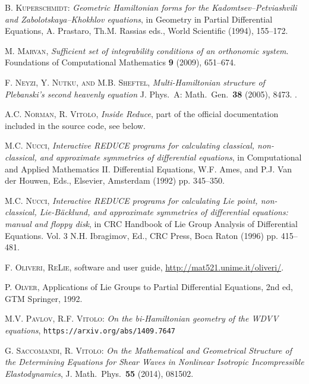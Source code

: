 \begin{thebibliography}{999}
 \textsc{B. Kuperschmidt}:
  \emph{Geometric Hamiltonian forms for the
    Kadomtsev--Petviashvili and Zabolotskaya--Khokhlov equations}, in Geometry
  in Partial Differential Equations, A. Prastaro, Th.M. Rassias eds., World
  Scientific (1994), 155--172.

 \textsc{M. Marvan}, \emph{Sufficient set of integrability
    conditions of an orthonomic system}.  Foundations of Computational
    Mathematics \textbf{9} (2009), 651--674.

 \textsc{F. Neyzi, Y. Nutku, and
      M.B. Sheftel}, \emph{Multi-Hamiltonian structure of Plebanski's second
      heavenly equation} J. Phys.\ A: Math.\ Gen.\ \textbf{38} (2005),
    8473. .

 \textsc{A.C. Norman, R. Vitolo}, \emph{Inside Reduce}, part
    of the official \REDUCE documentation included in the source code, see
    below.

 \textsc{M.C. Nucci}, \emph{Interactive REDUCE
      programs for calculating classical, non-classical, and approximate
      symmetries of differential equations}, in Computational and Applied
    Mathematics II. Differential Equations, W.F. Ames, and P.J. Van der Houwen,
    Eds., Elsevier, Amsterdam (1992) pp. 345--350.

 \textsc{M.C. Nucci}, \emph{Interactive REDUCE programs for
    calculating Lie point, non-classical, Lie-B\"{a}cklund, and approximate
    symmetries of differential equations: manual and floppy disk}, in
CRC Handbook of Lie Group Analysis of Differential Equations. Vol. 3
N.H. Ibragimov, Ed., CRC Press, Boca Raton (1996) pp. 415--481.

 \textsc{F. Oliveri}, \textsc{ReLie}, \REDUCE software and user
  guide, \url{http://mat521.unime.it/oliveri/}.

 \textsc{P. Olver}, Applications of Lie Groups to Partial
  Differential Equations, 2nd ed, GTM Springer, 1992.

 \textsc{M.V. Pavlov, R.F. Vitolo}: \emph{On the bi-Hamiltonian
    geometry of the WDVV equations}, \texttt{https://arxiv.org/abs/1409.7647}

 \textsc{G. Saccomandi, R. Vitolo}: \emph{On the Mathematical
    and Geometrical Structure of the Determining Equations for Shear Waves in
    Nonlinear Isotropic Incompressible Elastodynamics}, J. Math.\ Phys.\
  \textbf{55} (2014), 081502.


\end{thebibliography}
